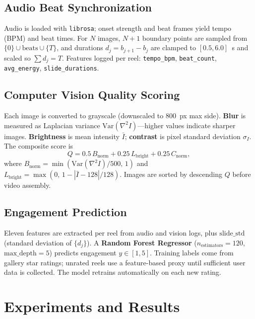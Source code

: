 \documentclass{article}
\begin{document}
\subsection{Audio Beat Synchronization}

Audio is loaded with \texttt{librosa}; onset strength and beat frames yield tempo (BPM) and beat times.
For $N$ images, $N{+}1$ boundary points are sampled from $\{0\} \cup \text{beats} \cup \{T\}$, and durations $d_j = b_{j+1} - b_j$ are clamped to $[0.5, 6.0]$~s and scaled so $\sum d_j = T$.
Features logged per reel: \texttt{tempo\_bpm}, \texttt{beat\_count}, \texttt{avg\_energy}, \texttt{slide\_durations}.

\subsection{Computer Vision Quality Scoring}

Each image is converted to grayscale (downscaled to 800~px max side).
\textbf{Blur} is measured as Laplacian variance $\mathrm{Var}(\nabla^2 I)$---higher values indicate sharper images.
\textbf{Brightness} is mean intensity $\bar{I}$; \textbf{contrast} is pixel standard deviation $\sigma_I$.
The composite score is
\begin{equation}
Q = 0.5\,B_{\mathrm{norm}} + 0.25\,L_{\mathrm{bright}} + 0.25\,C_{\mathrm{norm}},
\end{equation}
where $B_{\mathrm{norm}} = \min(\mathrm{Var}(\nabla^2 I)/500,\,1)$ and $L_{\mathrm{bright}} = \max(0,\,1 - |\bar{I}-128|/128)$.
Images are sorted by descending $Q$ before video assembly.

\subsection{Engagement Prediction}

Eleven features are extracted per reel from audio and vision logs, plus $\mathrm{slide\_std}$ (standard deviation of $\{d_j\}$).
A \textbf{Random Forest Regressor} ($n_{\mathrm{estimators}}{=}120$, $\mathrm{max\_depth}{=}5$) predicts engagement $y \in [1,5]$.
Training labels come from gallery star ratings; unrated reels use a feature-based proxy until sufficient user data is collected.
The model retrains automatically on each new rating.

\section{Experiments and Results}
\label{sec:results}
\end{document}
